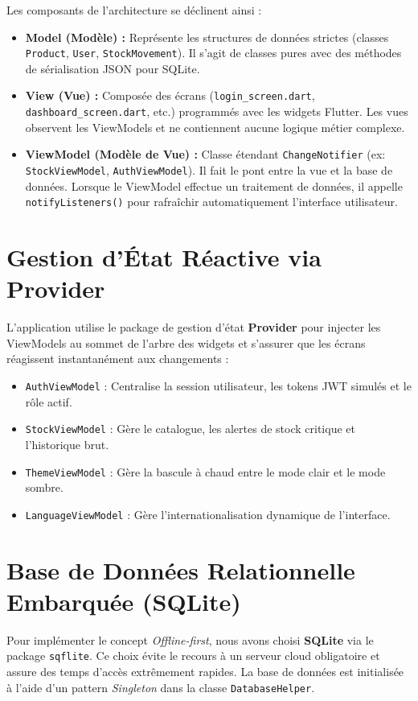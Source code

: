\documentclass[12pt,a4paper]{report}
\begin{document}
Les composants de l'architecture se déclinent ainsi :
\begin{itemize}
    \item \textbf{Model (Modèle) :} Représente les structures de données strictes (classes \texttt{Product}, \texttt{User}, \texttt{StockMovement}). Il s'agit de classes pures avec des méthodes de sérialisation JSON pour SQLite.
    \item \textbf{View (Vue) :} Composée des écrans (\texttt{login\_screen.dart}, \texttt{dashboard\_screen.dart}, etc.) programmés avec les widgets Flutter. Les vues observent les ViewModels et ne contiennent aucune logique métier complexe.
    \item \textbf{ViewModel (Modèle de Vue) :} Classe étendant \texttt{ChangeNotifier} (ex: \texttt{StockViewModel}, \texttt{AuthViewModel}). Il fait le pont entre la vue et la base de données. Lorsque le ViewModel effectue un traitement de données, il appelle \texttt{notifyListeners()} pour rafraîchir automatiquement l'interface utilisateur.
\end{itemize}

\section{Gestion d'État Réactive via Provider}
L'application utilise le package de gestion d'état \textbf{Provider} pour injecter les ViewModels au sommet de l'arbre des widgets et s'assurer que les écrans réagissent instantanément aux changements :
\begin{itemize}
    \item \texttt{AuthViewModel} : Centralise la session utilisateur, les tokens JWT simulés et le rôle actif.
    \item \texttt{StockViewModel} : Gère le catalogue, les alertes de stock critique et l'historique brut.
    \item \texttt{ThemeViewModel} : Gère la bascule à chaud entre le mode clair et le mode sombre.
    \item \texttt{LanguageViewModel} : Gère l'internationalisation dynamique de l'interface.
\end{itemize}

\section{Base de Données Relationnelle Embarquée (SQLite)}
Pour implémenter le concept \emph{Offline-first}, nous avons choisi \textbf{SQLite} via le package \texttt{sqflite}. Ce choix évite le recours à un serveur cloud obligatoire et assure des temps d'accès extrêmement rapides.
La base de données est initialisée à l'aide d'un pattern \emph{Singleton} dans la classe \texttt{DatabaseHelper}.
\end{document}
